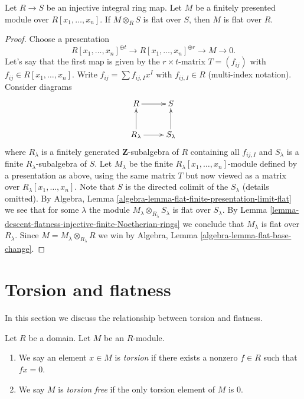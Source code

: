 \begin{lemma}
\label{lemma-descent-flatness-injective-integral}
Let $R \to S$ be an injective integral ring map.
Let $M$ be a finitely presented module over $R[x_1, \ldots, x_n]$.
If $M \otimes_R S$ is flat over $S$, then $M$ is flat over $R$.
\end{lemma}

\begin{proof}
Choose a presentation
$$
R[x_1, \ldots, x_n]^{\oplus t} \to R[x_1, \ldots, x_n]^{\oplus r} \to M \to 0.
$$
Let's say that the first map is given by the $r \times t$-matrix
$T = (f_{ij})$ with $f_{ij} \in R[x_1, \ldots, x_n]$. Write
$f_{ij} = \sum f_{ij, I} x^I$ with $f_{ij, I} \in R$ (multi-index notation).
Consider diagrams
$$
\xymatrix{
R \ar[r] & S \\
R_\lambda \ar[u] \ar[r] & S_\lambda \ar[u]
}
$$
where $R_\lambda$ is a finitely generated $\mathbf{Z}$-subalgebra of
$R$ containing all $f_{ij, I}$ and $S_\lambda$ is a finite
$R_\lambda$-subalgebra of $S$. Let $M_\lambda$ be the finite
$R_\lambda[x_1, \ldots, x_n]$-module defined by a presentation
as above, using the same matrix $T$ but now viewed as a matrix
over $R_\lambda[x_1, \ldots, x_n]$. Note that $S$ is the directed colimit
of the $S_\lambda$ (details omitted). By
Algebra, Lemma \ref{algebra-lemma-flat-finite-presentation-limit-flat}
we see that for some $\lambda$ the module
$M_\lambda \otimes_{R_\lambda} S_\lambda$ is flat over $S_\lambda$. By
Lemma \ref{lemma-descent-flatness-injective-finite-Noetherian-rings}
we conclude that $M_\lambda$ is flat over $R_\lambda$. Since
$M = M_\lambda \otimes_{R_\lambda} R$ we win by
Algebra, Lemma \ref{algebra-lemma-flat-base-change}.
\end{proof}




\section{Torsion and flatness}
\label{section-torsion-flat}

\noindent
In this section we discuss the relationship between torsion and flatness.

\begin{definition}
\label{definition-torsion}
Let $R$ be a domain. Let $M$ be an $R$-module.
\begin{enumerate}
\item We say an element $x \in M$ is {\it torsion} if there exists
a nonzero $f \in R$ such that $fx = 0$.
\item We say $M$ is {\it torsion free} if the only torsion element of $M$
is $0$.
\end{enumerate}
\end{definition}

